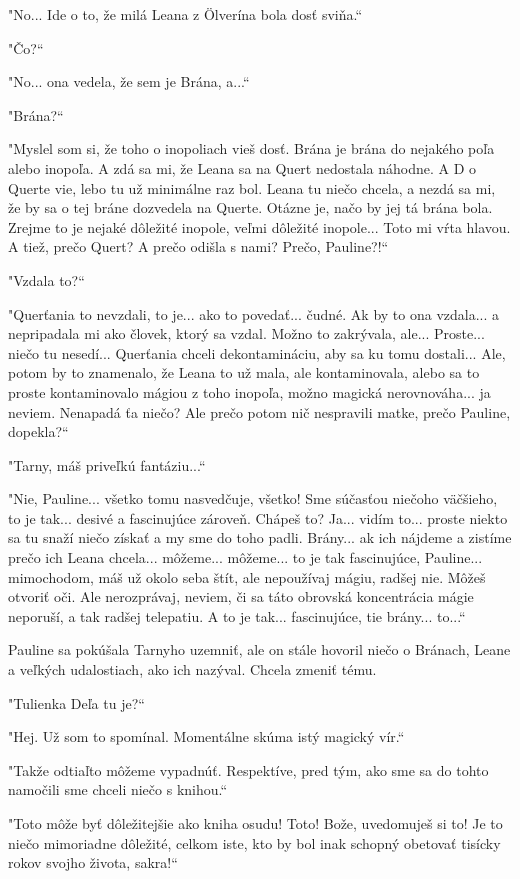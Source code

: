 \documentclass{book}
\begin{document}
"$ $No... Ide o to, že milá Leana z Ölverína bola dosť sviňa.“

"$ $Čo?“

"$ $No... ona vedela, že sem je Brána, a...“

"$ $Brána?“

"$ $Myslel som si, že toho o inopoliach vieš dosť. Brána je brána do nejakého poľa alebo inopoľa. A zdá sa mi, že Leana sa na Quert nedostala náhodne. A D o Querte vie, lebo tu už minimálne raz bol. Leana tu niečo chcela, a nezdá sa mi, že by sa o tej bráne dozvedela na Querte. Otázne je, načo by jej tá brána bola. Zrejme to je nejaké dôležité inopole, veľmi dôležité inopole... Toto mi vŕta hlavou. A tiež, prečo Quert? A prečo odišla s nami? Prečo, Pauline?!“

"$ $Vzdala to?“

"$ $Querťania to nevzdali, to je... ako to povedať... čudné. Ak by to ona vzdala... a nepripadala mi ako človek, ktorý sa vzdal. Možno to zakrývala, ale... Proste... niečo tu nesedí... Querťania chceli dekontamináciu, aby sa ku tomu dostali... Ale, potom by to znamenalo, že Leana to už mala, ale kontaminovala, alebo sa to proste kontaminovalo mágiou z toho inopoľa, možno magická nerovnováha... ja neviem. Nenapadá ťa niečo? Ale prečo potom nič nespravili matke, prečo Pauline, dopekla?“

"$ $Tarny, máš priveľkú fantáziu...“

"$ $Nie, Pauline... všetko tomu nasvedčuje, všetko! Sme súčasťou niečoho väčšieho, to je tak... desivé a fascinujúce zároveň. Chápeš to? Ja... vidím to... proste niekto sa tu snaží niečo získať a my sme do toho padli. Brány... ak ich nájdeme a zistíme prečo ich Leana chcela... môžeme... môžeme... to je tak fascinujúce, Pauline... mimochodom, máš už okolo seba štít, ale nepoužívaj mágiu, radšej nie. Môžeš otvoriť oči. Ale nerozprávaj, neviem, či sa táto obrovská koncentrácia mágie neporuší, a tak radšej telepatiu. A to je tak... fascinujúce, tie brány... to...“

Pauline sa pokúšala Tarnyho uzemniť, ale on stále hovoril niečo o Bránach, Leane a veľkých udalostiach, ako ich nazýval. Chcela zmeniť tému.

"$ $Tulienka Deľa tu je?“

"$ $Hej. Už som to spomínal. Momentálne skúma istý magický vír.“

"$ $Takže odtiaľto môžeme vypadnúť. Respektíve, pred tým, ako sme sa do tohto namočili sme chceli niečo s knihou.“

"$ $Toto môže byť dôležitejšie ako kniha osudu! Toto! Bože, uvedomuješ si to! Je to niečo mimoriadne dôležité, celkom iste, kto by bol inak schopný obetovať tisícky rokov svojho života, sakra!“
\end{document}
